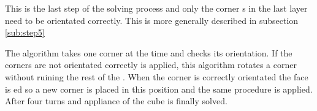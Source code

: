 This is the last step of the solving process and only the corner \cpiece{}s in the last layer need to be orientated correctly. This is more generally described in subsection \ref{sub:step5}

The algorithm takes one corner \cpiece{} at the time and checks its orientation. If the corners are not orientated correctly  is applied, this algorithm rotates a corner without ruining the rest of the \cube{}. When the corner is correctly orientated the  face is \twist{}ed so a new corner is placed in this position and the same procedure is applied. After four  turns and appliance of  the cube is finally solved. 

\begin{comment}
In the last layer the corners in the last layer were poisitend correctly but not oreiented. In this step will the coreners be oreinted correctly and as result it will lead to that the \rubiks{} will be solved.

This step is very simple because it there is only four corners to control and either the corner is oriented correctly or is isn't.  

The program vil first control that the front-right-up corner is oriented correctly if not the will use the an algorithm twice and after the program vil control the corner again if the corner is not oriented correctly his time the use teh algorithme and will continue with this until the corner is oriented correctly. 
Then the corner is orented correctly the program will make at up move ("U") and will control the new corner and the program will do this with every corner in the last layer until they are oriented corectly.  

\end{comment}
